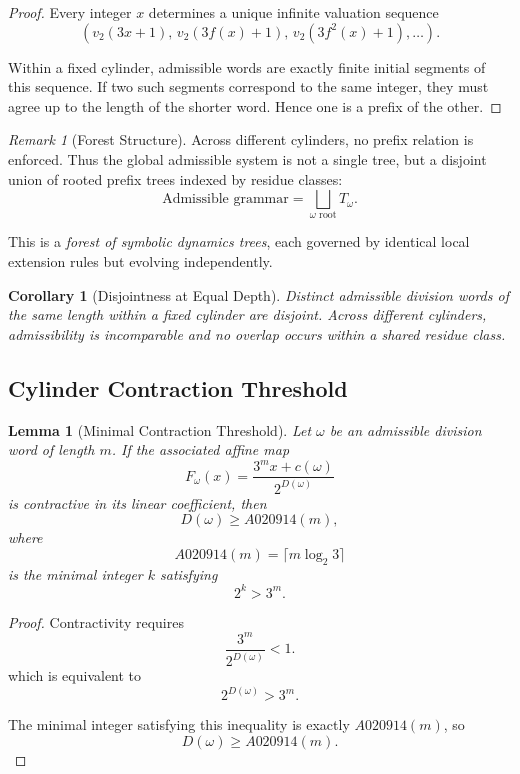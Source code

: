 \documentclass[12pt, oneside]{article}
\numberwithin{equation}{section}
\theoremstyle{definition}
\theoremstyle{plain}
\newtheorem{lemma}[theorem]{Lemma}
\newtheorem{corollary}[theorem]{Corollary}
\theoremstyle{remark}
\newtheorem*{remark}{Remark}
\begin{document}
\begin{proof}
Every integer $x$ determines a unique infinite valuation sequence
\[
(v_2(3x+1),\, v_2(3f(x)+1),\, v_2(3f^2(x)+1),\dots).
\]

Within a fixed cylinder, admissible words are exactly finite initial
segments of this sequence. If two such segments correspond to the same
integer, they must agree up to the length of the shorter word. Hence
one is a prefix of the other.
\end{proof}

\begin{remark}[Forest Structure]
Across different cylinders, no prefix relation is enforced. Thus the
global admissible system is not a single tree, but a disjoint union of
rooted prefix trees indexed by residue classes:
\[
\text{Admissible grammar} = \bigsqcup_{\omega \text{ root}} T_\omega.
\]

This is a \emph{forest of symbolic dynamics trees}, each governed by
identical local extension rules but evolving independently.
\end{remark}

\begin{corollary}[Disjointness at Equal Depth]
Distinct admissible division words of the same length within a fixed
cylinder are disjoint. Across different cylinders, admissibility is
incomparable and no overlap occurs within a shared residue class.
\end{corollary}

\subsection{Cylinder Contraction Threshold}

\begin{lemma}[Minimal Contraction Threshold]
Let $\omega$ be an admissible division word of length $m$. If the
associated affine map
\[
F_\omega(x)
=
\frac{3^m x+c(\omega)}{2^{D(\omega)}}
\]
is contractive in its linear coefficient, then
\[
D(\omega)\ge A020914(m),
\]
where
\[
A020914(m)=\lceil m\log_2 3\rceil
\]
is the minimal integer \(k\) satisfying
\[
2^k>3^m.
\]
\end{lemma}

\begin{proof}
Contractivity requires
\[
\frac{3^m}{2^{D(\omega)}}<1.
\]
which is equivalent to
\[
2^{D(\omega)}>3^m.
\]

The minimal integer satisfying this inequality is exactly
$A020914(m)$, so
\[
D(\omega)\ge A020914(m).
\]
\end{proof}
\end{document}
